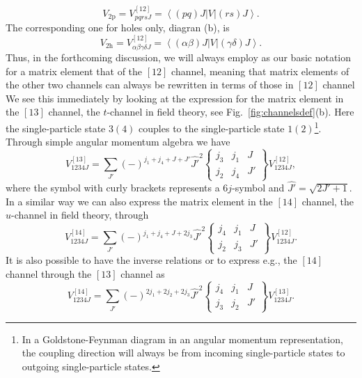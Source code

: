 \begin{equation}
      V_{\mathrm{2p}}=V_{pqrs J}^{[12]}=
       \left\langle (pq)J\right | V\left | (rs)J\right\rangle.
       \label{eq:2pv}
\end{equation}
The corresponding one for holes only, diagran (b), is
\begin{equation}
      V_{\mathrm{2h}}=V_{\alpha\beta\gamma\delta J}^{[12]}=
       \left\langle (\alpha\beta)J\right | V
       \left | (\gamma\delta)J\right\rangle.
       \label{eq:2hv}
\end{equation}
Thus, in the forthcoming discussion, we will always employ as our 
basic notation for a matrix element that of the $[12]$ channel,
meaning that matrix elements of the other two channels
can always be rewritten in terms of those in $[12]$ channel
We see this immediately by looking at the expression for the 
matrix element in the $[13]$ channel, the $t$-channel in field
theory, see Fig.\ 
\ref{fig:channelsdef}(b). Here the single-particle state $3(4)$
couples to the single-particle state $1(2)$\footnote{In a Goldstone-Feynman
diagram in an angular momentum representation, the coupling direction
will always be from incoming single-particle states to outgoing
single-particle states.}.
Through simple angular momentum algebra we have 
\begin{equation}
      V_{1234J}^{[13]}=
      {\displaystyle \sum_{J'}}(-)^{j_1+j_4+J+J'}\hat{J'}^2
      \left\{
      \begin{array}{ccc}
       j_3&j_1&J\\j_2&j_4&J'
      \end{array}
       \right\}V_{1234J}^{[12]},
       \label{eq:13channel}
\end{equation}
where the symbol with curly brackets represents a $6j$-symbol and
$\hat{J'}=\sqrt{2J'+1}$.
In a similar way we can also express the matrix
element in the $[14]$ channel, the $u$-channel in field theory,
through  
\begin{equation}
       V_{1234J}^{[14]}=
      {\displaystyle \sum_{J'}}(-)^{j_1+j_4+J+2j_3}\hat{J'}^2
      \left\{
      \begin{array}{ccc}
       j_4&j_1&J\\j_2&j_3&J'
      \end{array}
       \right\}
       V_{1234J}^{[12]}.
       \label{eq:14channel}
\end{equation}
It is also possible to have the inverse relations or to express
e.g., the $[14]$ channel through the $[13]$ channel as
\begin{equation}
       V_{1234J}^{[14]}=
      {\displaystyle \sum_{J'}}(-)^{2j_1+2j_2+2j_3}\hat{J'}^2
      \left\{
      \begin{array}{ccc}
       j_4&j_1&J\\j_3&j_2&J'
      \end{array}
       \right\}
       V_{1234J}^{[13]}.
       \label{eq:1413channel}
\end{equation}
